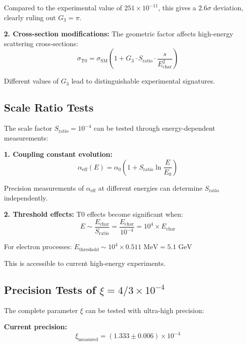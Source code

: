 \documentclass[12pt,a4paper]{report}
\begin{document}
	Compared to the experimental value of $251 \times 10^{-11}$, this gives a $2.6\sigma$ deviation, clearly ruling out $G_3 = \pi$.
	
	\textbf{2. Cross-section modifications:}
	The geometric factor affects high-energy scattering cross-sections:
	\begin{equation}
		\sigma_{\text{T0}} = \sigma_{\text{SM}} \left(1 + G_3 \cdot S_{\text{ratio}} \cdot \frac{s}{E_{\text{char}}^2}\right)
	\end{equation}
	
	Different values of $G_3$ lead to distinguishable experimental signatures.
	
	\subsection{Scale Ratio Tests}
	\label{subsec:scale_ratio_tests}
	
	The scale factor $S_{\text{ratio}} = 10^{-4}$ can be tested through energy-dependent measurements:
	
	\textbf{1. Coupling constant evolution:}
	\begin{equation}
		\alpha_{\text{eff}}(E) = \alpha_0 \left(1 + S_{\text{ratio}} \ln\frac{E}{E_0}\right)
	\end{equation}
	
	Precision measurements of $\alpha_{\text{eff}}$ at different energies can determine $S_{\text{ratio}}$ independently.
	
	\textbf{2. Threshold effects:}
	T0 effects become significant when:
	\begin{equation}
		E \sim \frac{E_{\text{char}}}{S_{\text{ratio}}} = \frac{E_{\text{char}}}{10^{-4}} = 10^4 \times E_{\text{char}}
	\end{equation}
	
	For electron processes: $E_{\text{threshold}} \sim 10^4 \times 0.511 \text{ MeV} = 5.1 \text{ GeV}$
	
	This is accessible to current high-energy experiments.
	
	\subsection{Precision Tests of $\xi = 4/3 \times 10^{-4}$}
	\label{subsec:precision_tests}
	
	The complete parameter $\xi$ can be tested with ultra-high precision:
	
	\textbf{Current precision:}
	\begin{equation}
		\xi_{\text{measured}} = (1.333 \pm 0.006) \times 10^{-4}
	\end{equation}
	
\end{document}
